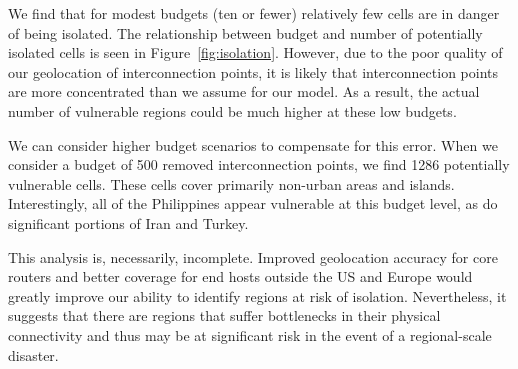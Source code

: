     We find that for modest budgets (ten or fewer) relatively few cells are in danger of being isolated.
    The relationship between budget and number of potentially isolated cells is seen in Figure~\ref{fig:isolation}. 
    However, due to the poor quality of our geolocation of interconnection points, it is likely that interconnection points are more concentrated than we assume for our model.
    As a result, the actual number of vulnerable regions could be much higher at these low budgets.

    We can consider higher budget scenarios to compensate for this error. 
    When we consider a budget of 500 removed interconnection points, we find 1286 potentially vulnerable cells. 
    These cells cover primarily non-urban areas and islands.
    Interestingly, all of the Philippines appear vulnerable at this budget level, as do significant portions of Iran and Turkey. 

    This analysis is, necessarily, incomplete.
    Improved geolocation accuracy for core routers and better coverage for end hosts outside the US and Europe would greatly improve our ability to identify regions at risk of isolation. 
    Nevertheless, it suggests that there are regions that suffer bottlenecks in their physical connectivity and thus may be at significant risk in the event of a regional-scale disaster. 
